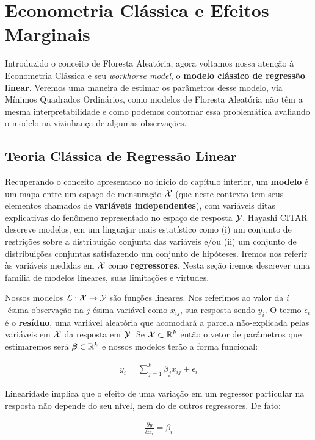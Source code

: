 
\chapter{Econometria Clássica e Efeitos Marginais}

Introduzido o conceito de Floresta Aleatória, agora voltamos nossa atenção à Econometria Clássica e seu \textit{workhorse model}, o \textbf{modelo clássico de regressão linear}. Veremos uma maneira de estimar os parâmetros desse modelo, via Mínimos Quadrados Ordinários, como modelos de Floresta Aleatória não têm a mesma interpretabilidade e como podemos contornar essa problemática avaliando o modelo na vizinhança de algumas observações. 



\section{Teoria Clássica de Regressão Linear}

Recuperando o conceito apresentado no início do capítulo interior, um \textbf{modelo} é um mapa entre um espaço de mensuração $\mathcal{X}$ (que neste contexto tem seus elementos chamados de \textbf{variáveis independentes}), com variáveis ditas explicativas do fenômeno representado no espaço de resposta $\mathcal{Y}$. Hayashi CITAR descreve modelos, em um linguajar mais estatístico como (i) um conjunto de restrições sobre a distribuição conjunta das variáveis e/ou (ii) um conjunto de distribuições conjuntas satisfazendo um conjunto de hipóteses. Iremos nos referir às variáveis medidas em $\mathcal{X}$ como \textbf{regressores}. Nesta seção iremos descrever uma família de modelos lineares, suas limitações e virtudes.



\begin{hipotese}[Linearidade]
Nossos modelos $\mathcal{L} : \mathcal{X} \to \mathcal{Y}$ são funções lineares. Nos referimos ao valor da $i$-ésima observação na $j$-ésima variável como $x_{ij}$, sua resposta sendo $y_i$. O termo $\epsilon_i$ é o \textbf{resíduo}, uma variável aleatória que acomodará a parcela não-explicada pelas variáveis em $\mathcal{X}$ da resposta em $\mathcal{Y}$. Se $\mathcal{X} \subset \mathbb{R}^k$ então o vetor de parâmetros que estimaremos será $\boldsymbol{\beta} \in \mathbb{R}^k$ e nossos modelos terão a forma funcional:

\begin{align}
    y_i = \sum_{j = 1}^k \beta_j x_{ij} + \epsilon_i \label{mod_lin}
\end{align}

Linearidade implica que o efeito de uma variação em um regressor particular na resposta não depende do seu nível, nem do de outros regressores. De fato:

\begin{align}
    \frac{\partial y}{\partial x_i} = \beta_i
\end{align}
\end{hipotese}


